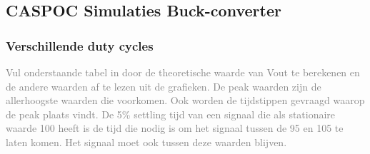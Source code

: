 \subsection{CASPOC Simulaties Buck-converter}
\subsubsection{Verschillende duty cycles}
\textcolor{gray}{Vul onderstaande tabel in door de theoretische waarde van Vout te berekenen en de andere waarden af te
lezen uit de grafieken. De peak waarden zijn de allerhoogste waarden die voorkomen. Ook
worden de tijdstippen gevraagd waarop de peak plaats vindt. De 5\% settling tijd van een
signaal die als stationaire waarde 100 heeft is de tijd die nodig is om het signaal tussen de
95 en 105 te laten komen. Het signaal moet ook tussen deze waarden blijven.
}
\begin{table}[h!]
\centering
{}
\caption{Nummerieke analyse buck converter 1}
\end{table}